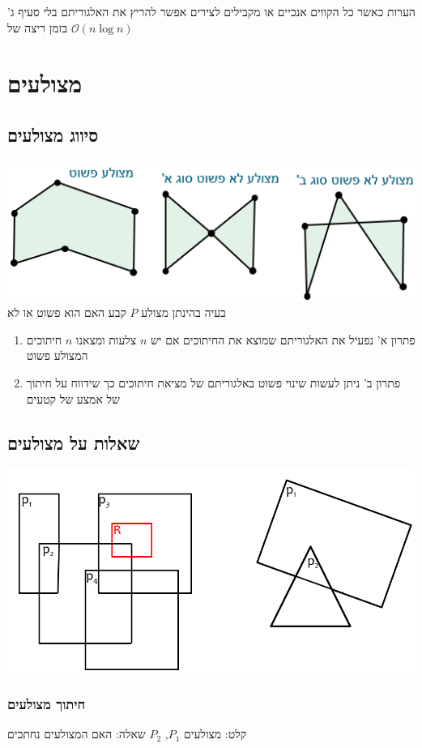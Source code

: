 \documentclass{article}
\makeatletter
\newcommand*{\saved@uline}{}
\let\saved@uline\uline
\newcommand*{\mathuline}{%
  \mathpalette{\math@uline\saved@uline}%
}
\newcommand*{\math@uline}[3]{%
  \mbox{#1{$#2#3\m@th$}}%
}
\renewcommand*{\uline}{%
  \relax  
  \ifmmode
    \expandafter\mathuline
  \else
    \expandafter\saved@uline
  \fi
}
\makeatother
\begin{document}
\noindent\uline{הערות} כאשר כל הקווים אנכיים או מקבילים לצירים אפשר להריץ את האלגוריתם בלי סעיף ג' בזמן ריצה של $\mathcal{O}(n\log n)$ 

\section{מצולעים}
\subsection{סיווג מצולעים}
\includegraphics[scale=0.7]{z10.png}
\noindent\uline{בעיה} בהינתן מצולע $P$ קבע האם הוא פשוט או לא
\begin{enumerate}
\item \uline{פתרון א'} נפעיל את האלגוריתם שמוצא את החיתוכים אם יש $n$ צלעות ומצאנו $n$ חיתוכים המצולע פשוט
\item\uline{פתרון ב'} ניתן לעשות שינוי פשוט באלגוריתם של מציאת חיתוכים כך שידווח על חיתוך של אמצע של קטעים
\end{enumerate}

\subsection{ שאלות על מצולעים}
\includegraphics[scale=0.5]{z11.png}
\subsubsection{חיתוך מצולעים}
\noindent \uline{קלט:} מצולעים $P_1$, $P_2$
\newline \uline{ שאלה:} האם המצולעים נחתכים
\end{document}
